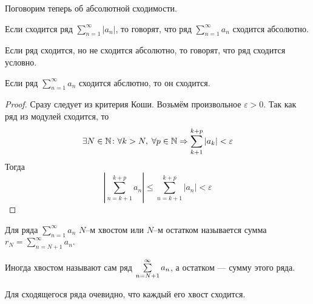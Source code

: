 Поговорим теперь об абсолютной сходимости.
\begin{Def}
	Если сходится ряд $\sum\limits_{n = 1}^{\infty}|a_n|$, то говорят, что ряд $\sum\limits_{n = 1}^{\infty}a_n$ сходится абсолютно.
\end{Def}
\begin{Def}
	Если ряд сходится, но не сходится абсолютно, то говорят, что ряд сходится условно.
\end{Def}
\begin{Statement}
	Если ряд $\sum\limits_{n=1}^{\infty}a_n$ сходится абслютно, то он сходится.
\end{Statement}
\begin{proof}
	Сразу следует из критерия Коши. Возьмём произвольное $\varepsilon>0$. Так как ряд из модулей сходится, то $$\exists N\in \mathbb{N}\colon \forall k>N,\; \forall p\in \mathbb{N} \Rightarrow \sum\limits_{k+1}^{k+p}|a_k| < \varepsilon$$
	Тогда $$\left| \sum\limits_{n=k+1}^{k+p}a_n\right| \leqslant \sum\limits_{n=k+1}^{k+p}|a_n| < \varepsilon$$
\end{proof}

\begin{Def}
	Для ряда $\sum \limits_{n=1}^{\infty}a_n$ $N$--м хвостом или $N$--м остатком называется сумма \\
	$
	r_N = \sum \limits_{n=N+1}^{\infty}a_n.
	$
\end{Def}

Иногда хвостом называют сам ряд $\sum\limits_{n=N+1}^{\infty} a_n$, а остатком --- сумму этого ряда.

Для сходящегося ряда очевидно, что каждый его хвост сходится.
